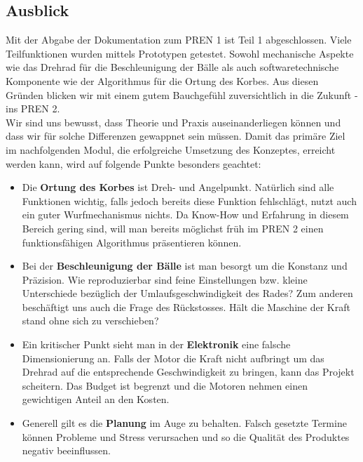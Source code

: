 \subsection{Ausblick}
Mit der Abgabe der Dokumentation zum PREN 1 ist Teil 1 abgeschlossen. Viele Teilfunktionen wurden mittels Prototypen getestet. Sowohl mechanische Aspekte wie das Drehrad für die Beschleunigung der Bälle als auch softwaretechnische Komponente wie der Algorithmus für die Ortung des Korbes. Aus diesen Gründen blicken wir mit einem gutem Bauchgefühl zuversichtlich in die Zukunft - ins PREN 2. \\
Wir sind uns bewusst, dass Theorie und Praxis auseinanderliegen können und dass wir für solche Differenzen gewappnet sein müssen. Damit das primäre Ziel im nachfolgenden Modul, die erfolgreiche Umsetzung des Konzeptes, erreicht werden kann, wird auf folgende Punkte besonders geachtet:

\begin{itemize}
	\item Die \textbf{Ortung des Korbes} ist Dreh- und Angelpunkt. Natürlich sind alle Funktionen wichtig, falls jedoch bereits diese Funktion fehlschlägt, nutzt auch ein guter Wurfmechanismus nichts. Da Know-How und Erfahrung in diesem Bereich gering sind, will man bereits möglichst früh im PREN 2 einen funktionsfähigen Algorithmus präsentieren können.
	
	\item Bei der \textbf{Beschleunigung der Bälle} ist man besorgt um die Konstanz und Präzision. Wie reproduzierbar sind feine Einstellungen bzw. kleine Unterschiede bezüglich der Umlaufsgeschwindigkeit des Rades? Zum anderen beschäftigt uns auch die Frage des Rückstosses. Hält die Maschine der Kraft stand ohne sich zu verschieben?
	
	\item Ein kritischer Punkt sieht man in der  \textbf{Elektronik} eine falsche Dimensionierung an. Falls der Motor die Kraft nicht aufbringt um das Drehrad auf die entsprechende Geschwindigkeit zu bringen, kann das Projekt scheitern. Das Budget ist begrenzt und die Motoren nehmen einen gewichtigen Anteil an den Kosten.
	
	\item Generell gilt es die \textbf{Planung} im Auge zu behalten. Falsch gesetzte Termine können Probleme und Stress verursachen und so die Qualität des Produktes negativ beeinflussen.
	
\end{itemize}